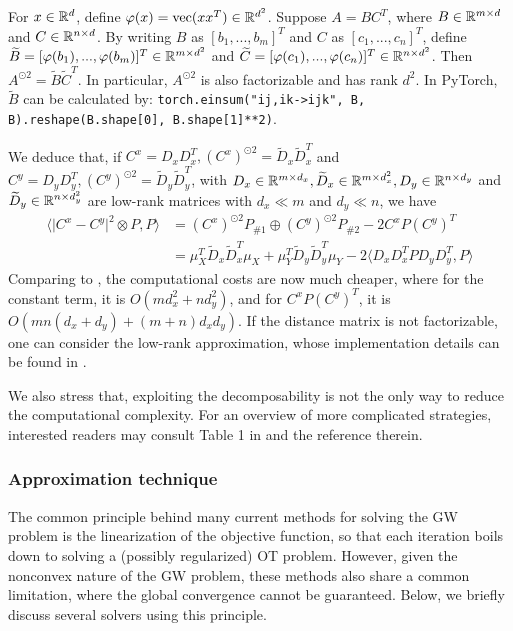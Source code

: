 \begin{lemma}
  For $x \in \mathbb R^d$, define $\varphi(x) = \text{vec}(xx^T) \in \mathbb R^{d^2}$.
  Suppose $A = B C^T$, where $B \in \mathbb R^{m \times d}$ and $C \in \mathbb R^{n \times d}$.
  By writing $B$ as $[b_1, ..., b_m]^T$ and $C$ as $[c_1, ..., c_n]^T$, define
  $\widetilde{B} = [\varphi(b_1), ..., \varphi(b_m)]^T \in \mathbb R^{m \times d^2}$ and
  $\widetilde{C} = [\varphi(c_1), ..., \varphi(c_n)]^T \in \mathbb R^{n \times d^2}$.
  Then $A^{\odot 2} = \widetilde{B} \widetilde{C}^T$. In particular, $A^{\odot 2}$ is also
  factorizable and has rank $d^2$. In PyTorch, $\widetilde{B}$ can be calculated by:
  \texttt{torch.einsum("ij,ik->ijk", B, B).reshape(B.shape[0], B.shape[1]**2)}.
\end{lemma}
We deduce that, if $C^x = D_x D_x^T, (C^x)^{\odot 2} = \widetilde{D}_x \widetilde{D}_x^T$
and $C^y = D_y D_y^T, (C^y)^{\odot 2} = \widetilde{D}_y \widetilde{D}_y^T$,
with $D_x \in \mathbb R^{m \times d_x}, \widetilde{D}_x \in \mathbb R^{m \times d_x^2},
D_y \in \mathbb R^{n \times d_y}$ and $\widetilde{D}_y \in \mathbb R^{n \times d_y^2}$ are low-rank matrices
with $d_x \ll m$ and $d_y \ll n$, we have
\begin{align}
  \langle \vert C^x - C^y \vert^2 \otimes P, P \rangle
  &= (C^x)^{\odot 2} P_{\# 1} \oplus (C^y)^{\odot 2} P_{\# 2} - 2 C^x P (C^y)^T \\
  &= \mu_X^T \widetilde{D}_x \widetilde{D}_x^T \mu_X
  + \mu_Y^T \widetilde{D}_y \widetilde{D}_y^T \mu_Y - 2 \langle D_x D_x^T P D_y D_y^T, P \rangle
\end{align}
Comparing to , the computational costs are now much cheaper,
where for the constant term, it is $O(m d_x^2 + n d_y^2)$, and for $C^x P (C^y)^T$,
it is $O(mn(d_x + d_y) + (m+n) d_x d_y)$. If the distance matrix is not factorizable,
one can consider the low-rank approximation,
whose implementation details can be found in \citep{Meyer21a}.

We also stress that, exploiting the decomposability is not the only way to reduce the computational
complexity. For an overview of more complicated strategies,
interested readers may consult Table 1 in \citep{Li23} and the reference therein.

\subsubsection{Approximation technique}
The common principle behind many current methods for solving the GW problem
is the linearization of the objective function,
so that each iteration boils down to solving a (possibly regularized)
OT problem. However, given the nonconvex nature of the GW problem, these methods also share
a common limitation, where the global convergence cannot be guaranteed.
Below, we briefly discuss several solvers using this principle.

